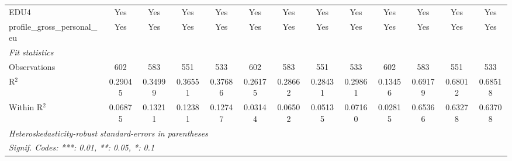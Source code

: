 \begin{tabular}{lcccccccccccc}
   EDU4                                      & Yes      & Yes      & Yes      & Yes      & Yes           & Yes      & Yes      & Yes      & Yes      & Yes      & Yes            & Yes\\  
   profile\_gross\_personal\_eu              & Yes      & Yes      & Yes      & Yes      & Yes           & Yes      & Yes      & Yes      & Yes      & Yes      & Yes            & Yes\\  
   \midrule
   \emph{Fit statistics}\\
   Observations                              & 602      & 583      & 551      & 533      & 602           & 583      & 551      & 533      & 602      & 583      & 551            & 533\\  
   R$^2$                                     & 0.29045  & 0.34999  & 0.36551  & 0.37686  & 0.26175       & 0.28662  & 0.28431  & 0.29861  & 0.13456  & 0.69179  & 0.68012        & 0.68518\\  
   Within R$^2$                              & 0.06875  & 0.13211  & 0.12381  & 0.12747  & 0.03144       & 0.06502  & 0.05135  & 0.07160  & 0.02815  & 0.65366  & 0.63278        & 0.63708\\  
   \midrule \midrule
   \multicolumn{13}{l}{\emph{Heteroskedasticity-robust standard-errors in parentheses}}\\
   \multicolumn{13}{l}{\emph{Signif. Codes: ***: 0.01, **: 0.05, *: 0.1}}\\
\end{tabular}
\par\endgroup



